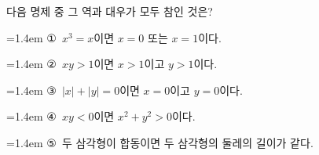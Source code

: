 다음 명제 중 그 역과 대우가 모두 참인 것은? 
\par\medskip\par\noindent\hangindent=1.4em {\small ①}\ $x^3=x$이면 $x=0$ 또는 $x=1$이다.\par\noindent\hangindent=1.4em {\small ②}\ $xy>1$이면 $x>1$이고 $y>1$이다.\par\noindent\hangindent=1.4em {\small ③}\ $|x|+|y|=0$이면 $x=0$이고 $y=0$이다.\par\noindent\hangindent=1.4em {\small ④}\ $xy<0$이면 $x^2+y^2>0$이다.\par\noindent\hangindent=1.4em {\small ⑤}\ 두 삼각형이 합동이면 두 삼각형의 둘레의 길이가 같다.\par\medskip
